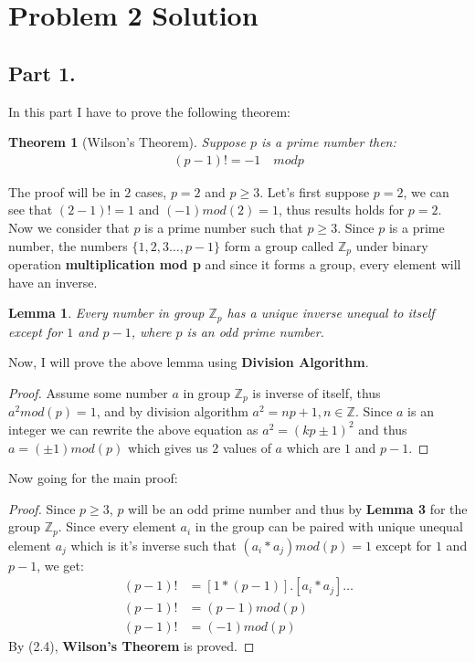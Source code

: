 \documentclass{article}
\newtheorem{theorem}{Theorem}
\newtheorem{lemma}{Lemma}
\begin{document}
\section{Problem 2 Solution}{
  \subsection{Part 1.}{
    In this part I have to prove the following theorem:
    \begin{theorem}[Wilson's Theorem]
      Suppose $p$ is a prime number then:
      \begin{align}
        (p-1)! = -1 \quad mod p \label{eq:1}
      \end{align}
    \end{theorem}
    The proof will be in $2$ cases, $p=2$ and $p \geq 3$.
      Let's first suppose $p=2$, we can see that $(2-1)!=1$ and $(-1)mod(2)=1$, thus results holds for $p=2$. \newline
      Now we consider that $p$ is a prime number such that $p \geq 3$.
      Since $p$ is a prime number, the numbers $\{1,2,3\dots ,p-1\}$ form a group called ${\mathbb{Z}}_p$ under binary operation \textbf{multiplication mod p} and since it forms a group, every element will have an inverse.
      \begin{lemma}
        Every number in group ${\mathbb{Z}}_p$ has a unique inverse unequal to itself except for $1$ and $p-1$, where $p$ is an odd prime number.
      \end{lemma}
      Now, I will prove the above lemma using \textbf{Division Algorithm}.
      \begin{proof}
        Assume some number $a$ in group ${\mathbb{Z}}_p$ is inverse of itself, thus $a^2mod(p)=1$, and by division algorithm $a^2=np+1, n \in \mathbb{Z}$. \newline
        Since $a$ is an integer we can rewrite the above equation as $a^2=(kp\pm 1)^2$ and thus $a=(\pm 1)mod(p)$ which gives us $2$ values of $a$ which are $1$ and $p-1$.
      \end{proof}
      Now going for the main proof:
      \begin{proof}
        Since $p \geq 3$, $p$ will be an odd prime number and thus by \textbf{Lemma 3} for the group ${\mathbb{Z}}_p$. \newline
        Since every element $a_i$ in the group can be paired with unique unequal element $a_j$ which is it's inverse such that $(a_i*a_j)mod(p)=1$ except for $1$ and $p-1$, we get:
        \begin{align}
          (p-1)!&= [1*(p-1)].[a_i*a_j]\dots \label{eq:2} \\
          (p-1)!&=(p-1)mod(p) \\
          (p-1)!&=(-1)mod(p)
        \end{align}
        By (2.4), \textbf{Wilson's Theorem} is proved.
      \end{proof}
  }
}
\end{document}
